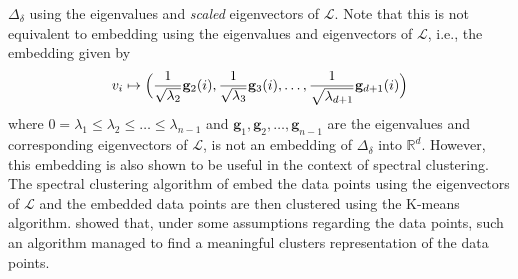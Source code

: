 $\Delta_\delta$ using the eigenvalues and \emph{scaled} eigenvectors
of $\bm{\mathcal{L}}$. Note that this is not equivalent to embedding
using the eigenvalues and eigenvectors of $\bm{\mathcal{L}}$, i.e.,
the embedding given by
\begin{equation}
  \label{eq:102}
  v_i \mapsto \Bigl( \frac{1}{\sqrt{\lambda_2}} \mathbf{g}_2(i),
  \frac{1}{\sqrt{\lambda_3}}\mathbf{g}_3(i), \dots, \frac{1}{\sqrt{\lambda_{d+1}}} \mathbf{g}_{d+1}(i) \Bigr)
\end{equation}
where $0 = \lambda_1 \leq \lambda_2 \leq \dots \leq \lambda_{n-1}$ and
$\bm{g}_1, \bm{g}_2, \dots, \bm{g}_{n-1}$ are the eigenvalues and
corresponding eigenvectors of $\bm{\mathcal{L}}$, is not an embedding
of $\Delta_{\delta}$ into $\mathbb{R}^{d}$. However, this embedding is
also shown to be useful in the context of spectral clustering. The
spectral clustering algorithm of \citet{ng02} embed the data points
using the eigenvectors of $\bm{\mathcal{L}}$ and the embedded data
points are then clustered using the K-means algorithm. \citet{ng02}
showed that, under some assumptions regarding the data points, such an
algorithm managed to find a meaningful clusters representation of the
data points.
%
